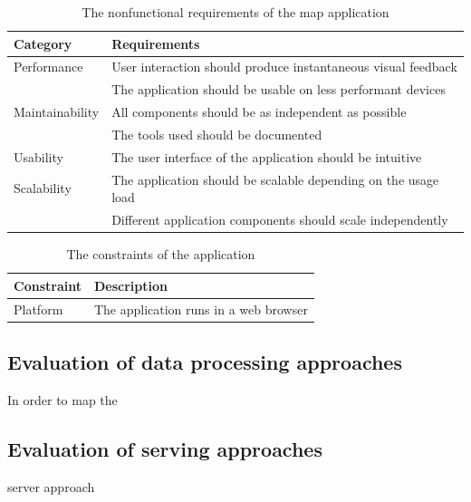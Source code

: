 \begin{table}[h]
	\centering
	\begin{tabular}{ | L{0.2\textwidth} | L{0.7\textwidth} | }
		\hline
		Category
		& Requirements
		\\
		\hline
		\hline
		Performance
		& \tabitem User interaction should produce instantaneous visual feedback \\
		& \tabitem The application should be usable on less performant devices \\
		\hline
		Maintainability
		& \tabitem All components should be as independent as possible \\
		& \tabitem The tools used should be documented \\
		\hline
		Usability
		& The user interface of the application should be intuitive
		\\
		\hline
		Scalability
		& \tabitem The application should be scalable depending on the usage load \\
		& \tabitem Different application components should scale independently \\
		\hline
	\end{tabular}
	\caption{The nonfunctional requirements of the map application}
	\label{tab:nonfunctional requirements}
\end{table}

\begin{table}[h]
	\centering
	\begin{tabular}{ | L{0.3\textwidth} | L{0.6\textwidth} | }
		\hline
		Constraint
		& Description
		\\
		\hline
		\hline
		Platform
		& The application runs in a web browser
		\\
		\hline
	\end{tabular}
	\caption{The constraints of the application}
	\label{tab:constraints}
\end{table}



\subsection{Evaluation of data processing approaches}
In order to map the 


\subsection{Evaluation of serving approaches}
server approach

